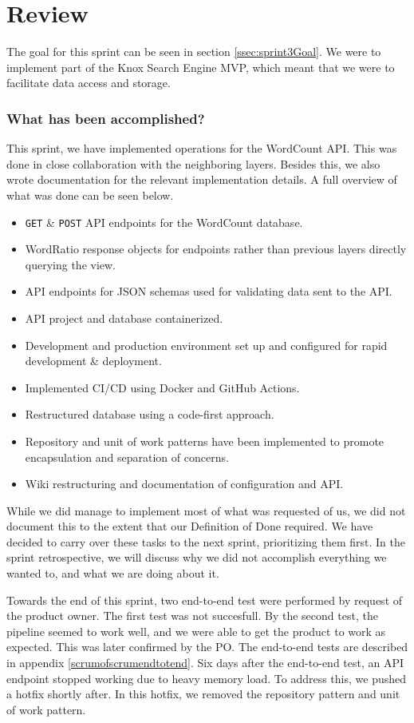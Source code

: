 \section{Review}
The goal for this sprint can be seen in section \ref{ssec:sprint3Goal}. We were to implement part of the Knox Search Engine MVP, which meant that we were to facilitate data access and storage.

\subsubsection{What has been accomplished?}
This sprint, we have implemented operations for the WordCount API. This was done in close collaboration with the neighboring layers. 
Besides this, we also wrote documentation for the relevant implementation details. A full overview of what was done can be seen below.

\begin{itemize}
    \item \texttt{GET} \& \texttt{POST} API endpoints for the WordCount database.
    \item WordRatio response objects for endpoints rather than previous layers directly querying the view.
    \item API endpoints for JSON schemas used for validating data sent to the API.
    \item API project and database containerized.
    \item Development and production environment set up and configured for rapid development \& deployment.
    \item Implemented CI/CD using Docker and GitHub Actions.
    \item Restructured database using a code-first approach.
    \item Repository and unit of work patterns have been implemented to promote encapsulation and separation of concerns.
    \item Wiki restructuring and documentation of configuration and API.
\end{itemize}

While we did manage to implement most of what was requested of us, we did not document this to the extent that our Definition of Done required. 
We have decided to carry over these tasks to the next sprint, prioritizing them first. In the sprint retrospective, we will discuss why we did not accomplish everything we wanted to, and what we are doing about it.

Towards the end of this sprint, two end-to-end test were performed by request of the \knox{} product owner. The first test was not succesfull.  By the second test, the pipeline seemed to work well, and we were able to get the product to work as expected. This was later confirmed by the PO. The end-to-end tests are described in appendix \ref{scrumofscrumendtotend}.
Six days after the end-to-end test, an API endpoint stopped working due to heavy memory load.
To address this, we pushed a hotfix shortly after. In this hotfix, we removed the repository pattern and unit of work pattern.

